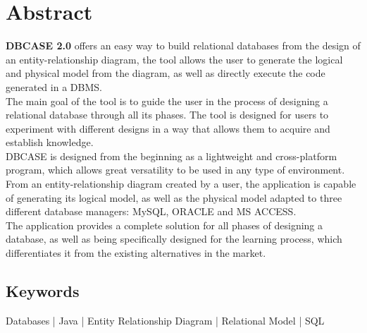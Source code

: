 \chapter{Abstract}
\textbf{DBCASE 2.0} offers an easy way to build relational databases from the design of an entity-relationship diagram, the tool allows the user to generate the logical and physical model from the diagram, as well as directly execute the code generated in a DBMS.\\

The main goal of the tool is to guide the user in the process of designing a relational database through all its phases. The tool is designed for users to experiment with different designs in a way that allows them to acquire and establish knowledge.\\

DBCASE is designed from the beginning as a lightweight and cross-platform program, which allows great versatility to be used in any type of environment.\\

From an entity-relationship diagram created by a user, the application is capable of generating its logical model, as well as the physical model adapted to three different database managers: MySQL, ORACLE and MS ACCESS.\\

The application provides a complete solution for all phases of designing a database, as well as being specifically designed for the learning process, which differentiates it from the existing alternatives in the market.

\section{Keywords}
Databases | Java | Entity Relationship Diagram | Relational Model | SQL
